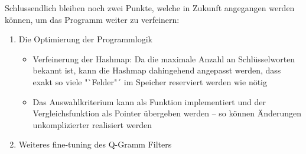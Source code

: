 Schlussendlich bleiben noch zwei Punkte, welche in Zukunft angegangen werden können, um das Programm weiter zu verfeinern:
\begin{enumerate}

\item Die Optimierung der Programmlogik \\
    \begin{itemize}
        \item Verfeinerung der Hashmap: Da die maximale Anzahl an Schlüsselworten bekannt ist, kann die Hashmap dahingehend angepasst werden, dass exakt so viele "`Felder"´ im Speicher reserviert werden wie nötig
        \item Das Auswahlkriterium kann als Funktion implementiert und der Vergleichsfunktion als Pointer übergeben werden -- so können Änderungen unkomplizierter realisiert werden
    \end{itemize}


\item Weiteres fine-tuning des Q-Gramm Filters


\end{enumerate}



